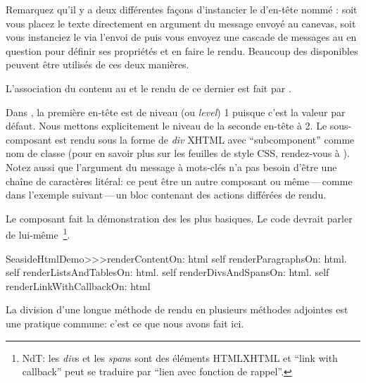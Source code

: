 \documentclass[a4paper,10pt,twoside]{book}
\begin{document}
Remarquez qu'il y a deux différentes façons d'instancier le \brush
d'en-tête nommé :
soit vous placez le texte directement en argument du message
envoyé au canevas,
soit vous instanciez le \brush via l'envoi de  puis 
vous envoyez une cascade de messages au \brush{} en question pour
définir ses propriétés et en faire le rendu.
Beaucoup des \brushes disponibles peuvent être utilisés de ces deux
manières.

L'association du contenu au \brush{} et le rendu de ce dernier est
fait par .

Dans , la première en-tête est de niveau
(ou \emph{level}) 1 puisque c'est la valeur par défaut.
Nous mettons explicitement le niveau de la seconde en-tête à 2.
Le sous-composant est rendu sous la forme de \emph{div} XHTML avec
``subcomponent'' comme nom de classe  (pour en savoir plus
sur les feuilles de style CSS, rendez-vous à ).
Notez aussi que l'argument du message à mots-clés  n'a pas
besoin d'être une chaîne de caractères litéral: ce peut être un autre
composant ou même\,---\,comme dans l'exemple suivant\,---\,un
bloc contenant des actions différées de rendu.

Le composant  fait la démonstration des \brushes{}
les plus basiques.
Le code devrait parler de lui-même~\footnote{NdT: les \emph{div}{s} et
  les \emph{span}{s} sont des éléments HTML\/XHTML et ``link with
  callback'' peut se traduire par ``lien avec fonction de rappel''.}.


\begin{code}{}
SeasideHtmlDemo>>>renderContentOn: html 
	self renderParagraphsOn: html.
	self renderListsAndTablesOn: html.
	self renderDivsAndSpansOn: html.
	self renderLinkWithCallbackOn: html
\end{code}

La division d'une longue méthode de rendu en plusieurs méthodes adjointes
est une pratique commune: c'est ce que nous avons fait ici.

\end{document}
